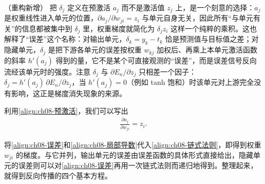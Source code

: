 \documentclass[../../main.tex]{subfiles}
\begin{document}
\begin{remark}（重构新增）
把 $\delta_j$ 定义在预激活 $a_j$ 而不是激活值 $z_j$ 上，是一个刻意的选择：$a_j$ 是权重线性进入单元的位置，$\partial a_j/\partial w_{ji}=z_i$ 与单元自身无关，因此所有“与单元有关”的信息都被集中到 $\delta_j$ 里，权重梯度就简化为 $\delta_j z_i$ 这样一个纯粹的乘积。这也解释了“误差”这个名称：对输出单元，$\delta_k=y_k-t_k$ 恰是预测值与目标值之差；对隐藏单元，$\delta_j$ 是把下游各单元的误差按权重 $w_{kj}$ 加权后、再乘上本单元激活函数的斜率 $h'(a_j)$ 得到的量，它不是某个可直接观测的“误差”，而是误差信号反向流经该单元时的强度。注意 $\delta_j$ 与 $\partial E_n/\partial z_j$ 只相差一个因子：$\delta_j=h'(a_j)\,\partial E_n/\partial z_j$，当 $h'(a_j)=0$（例如 tanh 饱和）时该单元对上游完全没有影响，这正是梯度消失现象的来源。
\end{remark}

利用\eqref{align:ch08-预激活}，我们可以写出
\begin{align}
\frac{\partial a_j}{\partial w_{ji}}=z_i.
\label{align:ch08-局部导数}
\end{align}

将\eqref{align:ch08-误差}和\eqref{align:ch08-局部导数}代入\eqref{align:ch08-链式法则}，即得到权重 $w_{ji}$ 的梯度。与它并列，输出单元的误差由误差函数的具体形式直接给出，隐藏单元的误差则可以对\eqref{align:ch08-误差}再用一次链式法则而递归地得到。整理起来，就得到反向传播的四个基本方程。
\end{document}
